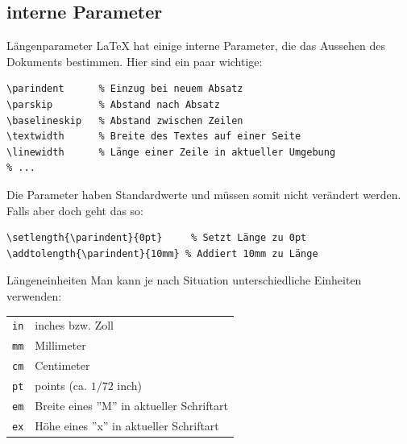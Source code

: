 \documentclass[xcolor=dvipsnames]{beamer}
\begin{document}
\subsection{interne Parameter}
\begin{frame}[fragile]{Längenparameter}
\LaTeX{} hat einige interne Parameter, die das Aussehen des Dokuments bestimmen. Hier sind ein paar wichtige: \par\medskip
\begin{lstlisting}
\parindent 		% Einzug bei neuem Absatz
\parskip 		% Abstand nach Absatz
\baselineskip 	% Abstand zwischen Zeilen
\textwidth 		% Breite des Textes auf einer Seite
\linewidth 		% Länge einer Zeile in aktueller Umgebung
% ...
\end{lstlisting}
Die Parameter haben Standardwerte und müssen somit nicht verändert werden. Falls aber doch geht das so: \par\medskip
\begin{lstlisting}
\setlength{\parindent}{0pt} 	% Setzt Länge zu 0pt
\addtolength{\parindent}{10mm} % Addiert 10mm zu Länge
\end{lstlisting}
\end{frame}


\begin{frame}[fragile]{Längeneinheiten}
Man kann je nach Situation unterschiedliche Einheiten verwenden: \par\medskip
\begin{tabular}{ll}
\texttt{in} & inches bzw. Zoll \\
\texttt{mm} & Millimeter \\
\texttt{cm} & Centimeter \\
\texttt{pt} & points (ca. $1/72$ inch) \\
\texttt{em} & Breite eines ''M'' in aktueller Schriftart \\
\texttt{ex} & Höhe eines ''x'' in aktueller Schriftart
\end{tabular}
\end{frame}
\end{document}
